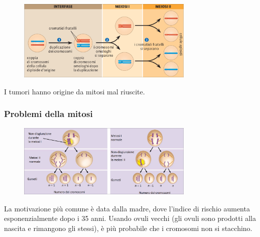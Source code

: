 \documentclass[a4paper]{article}
\begin{document}
\vspace{0.25cm}

\begin{center}
\begin{figure}[ht]
    \centering
    \includegraphics[width=0.75\textwidth]{./meiosi_schema}
\end{figure}
\end{center}


I tumori hanno origine da mitosi mal riuscite.

\subsubsection{Problemi della mitosi}


\begin{center}
\begin{figure}[ht]
    \centering
    \includegraphics[width=0.75\textwidth]{./trisomia21}
\end{figure}
\end{center}

La motivazione più comune è data dalla madre, dove l'indice di rischio aumenta
esponenzialmente dopo i 35 anni.
Usando ovuli vecchi (gli ovuli sono prodotti alla nascita e rimangono gli stessi),
è più probabile che i cromosomi non si stacchino.
\end{document}
